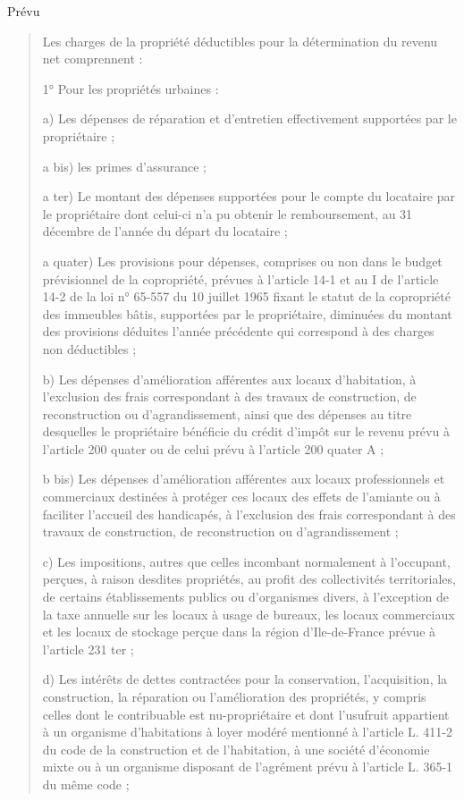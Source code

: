 				Prévu 
				\begin{quote}
					Les charges de la propriété déductibles pour la détermination du revenu net comprennent :

	1° Pour les propriétés urbaines :

	a) Les dépenses de réparation et d'entretien effectivement supportées par le propriétaire ;

	a bis) les primes d'assurance ;

	a ter) Le montant des dépenses supportées pour le compte du locataire par le propriétaire dont celui-ci n'a pu obtenir le remboursement, au 31 décembre de l'année du départ du locataire ;

	a quater) Les provisions pour dépenses, comprises ou non dans le budget prévisionnel de la copropriété, prévues à l'article 14-1 et au I de l'article 14-2 de la loi n° 65-557 du 10 juillet 1965 fixant le statut de la copropriété des immeubles bâtis, supportées par le propriétaire, diminuées du montant des provisions déduites l'année précédente qui correspond à des charges non déductibles ;

	b) Les dépenses d'amélioration afférentes aux locaux d'habitation, à l'exclusion des frais correspondant à des travaux de construction, de reconstruction ou d'agrandissement, ainsi que des dépenses au titre desquelles le propriétaire bénéficie du crédit d'impôt sur le revenu prévu à l'article 200 quater ou de celui prévu à l'article 200 quater A ;

	b bis) Les dépenses d'amélioration afférentes aux locaux professionnels et commerciaux destinées à protéger ces locaux des effets de l'amiante ou à faciliter l'accueil des handicapés, à l'exclusion des frais correspondant à des travaux de construction, de reconstruction ou d'agrandissement ;


	c) Les impositions, autres que celles incombant normalement à l'occupant, perçues, à raison desdites propriétés, au profit des collectivités territoriales, de certains établissements publics ou d'organismes divers, à l'exception de la taxe annuelle sur les locaux à usage de bureaux, les locaux commerciaux et les locaux de stockage perçue dans la région d'Ile-de-France prévue à l'article 231 ter ;

	d) Les intérêts de dettes contractées pour la conservation, l'acquisition, la construction, la réparation ou l'amélioration des propriétés, y compris celles dont le contribuable est nu-propriétaire et dont l'usufruit appartient à un organisme d'habitations à loyer modéré mentionné à l'article L. 411-2 du code de la construction et de l'habitation, à une société d'économie mixte ou à un organisme disposant de l'agrément prévu à l'article L. 365-1 du même code ;


\end{quote}
